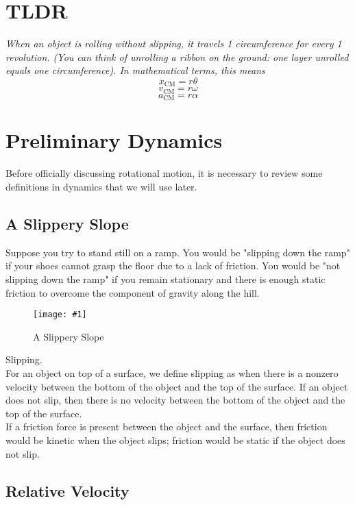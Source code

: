 \documentclass[11pt]{article}
\newcommand{\fig}[4]{
    \begin{figure}[H]
        \centering
        \texttt{[image: \#1]}
        \caption{#2}
        \label{exp4fit}
    \end{figure}
}
\theoremstyle{gangnamstyle}{\newtheorem{definition}{Definition}[]}
\theoremstyle{gangnamstyle}{\newtheorem{example}{Example}[]}
\theoremstyle{gangnamstyle}{\newtheorem{problem}{Problem}[]}
\theoremstyle{gangnamstyle}{\newtheorem{warning}{Warning}[]}
\begin{document}
\section{TLDR}

\textit{When an object is rolling without slipping, it travels 1 circumference for every 1 revolution. (You can think of unrolling a ribbon on the ground: one layer unrolled equals one circumference). In mathematical terms, this means}
\[ x_{\text{CM}} = r\theta \]
\[ v_{\text{CM}} = r\omega \]
\[ a_{\text{CM}} = r\alpha \]

\section{Preliminary Dynamics}

Before officially discussing rotational motion, it is necessary to review some definitions in dynamics that we will use later. 

\subsection{A Slippery Slope}

Suppose you try to stand still on a ramp. You would be "slipping down the ramp" if your shoes cannot grasp the floor due to a lack of friction. You would be "not slipping down the ramp" if you remain stationary and there is enough static friction to overcome the component of gravity along the hill. 

\fig{figs/n8/slip.jpeg}{A Slippery Slope}{0.1}{0}

\begin{definition}
Slipping. \\
For an object on top of a surface, we define slipping as when there is a nonzero velocity between the bottom of the object and the top of the surface. If an object does not slip, then there is no velocity between the bottom of the object and the top of the surface. \\

If a friction force is present between the object and the surface, then friction would be kinetic when the object slips; friction would be static if the object does not slip. 
\end{definition}

\pagebreak

\subsection{Relative Velocity}
\end{document}
